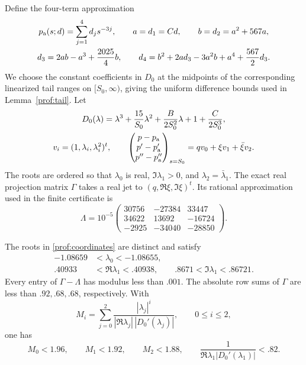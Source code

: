 Define the four-term approximation
\begin{equation}\label{prof:asymptotic-polynomial}
 \begin{gathered}
 p_{\rm a}(s;d)=\sum_{j=1}^4d_js^{-3j},\qquad
 a=d_1=Cd,\qquad b=d_2=a^2+567a,\\
 d_3=2ab-a^3+\frac{2025}{4}b,\qquad
 d_4=b^2+2ad_3-3a^2b+a^4+\frac{567}{2}d_3.
 \end{gathered}
\end{equation}
We choose the constant coefficients in $D_0$ at the midpoints of the
corresponding linearized tail ranges on $[S_0,\infty)$, giving the
uniform difference bounds used in Lemma~\ref{prof:tail}.  Let
\begin{equation}\label{prof:coordinates}
 \begin{gathered}
 D_0(\lambda)=\lambda^3+\frac{15}{S_0}\lambda^2
       +\frac{B}{2S_0^2}\lambda+1+\frac{C}{2S_0^3},\\
 v_i=(1,\lambda_i,\lambda_i^2)^t,\qquad
 \begin{pmatrix}p-p_{\rm a}\\p'-p_{\rm a}'\\p''-p_{\rm a}''\end{pmatrix}_{s=S_0}
       =qv_0+\xi v_1+\bar\xi v_2.
 \end{gathered}
\end{equation}
The roots are ordered so that $\lambda_0$ is real,
$\Im\lambda_1>0$, and $\lambda_2=\bar\lambda_1$.  The exact real
projection matrix $\Gamma$ takes a real jet to $(q,\Re\xi,\Im\xi)^t$.
Its rational approximation used in the finite certificate is
\begin{equation}\label{prof:projection-approximation}
 \Lambda=10^{-5}
 \begin{pmatrix}
 30756&-27384&33447\\
 34622&13692&-16724\\
 -2925&-34040&-28850
 \end{pmatrix}.
\end{equation}

\begin{lemma}\label{prof:root-bounds}
The roots in \eqref{prof:coordinates} are distinct and satisfy
\begin{equation}\label{prof:root-boxes}
 \begin{split}
 -1.08659&<\lambda_0<-1.08655,\\
 .40933&<\Re\lambda_1<.40938,\qquad
 .8671<\Im\lambda_1<.86721.
 \end{split}
\end{equation}
Every entry of $\Gamma-\Lambda$ has modulus less than $.001$.
The absolute row sums of $\Gamma$ are less than $.92,.68,.68$,
respectively.  With
\begin{equation}\label{prof:convolution-constants}
 M_i=\sum_{j=0}^2
 \frac{|\lambda_j|^i}{|\Re\lambda_j|\,|D_0'(\lambda_j)|},\qquad 0\le i\le2,
\end{equation}
one has
\[
 M_0<1.96,\qquad M_1<1.92,\qquad M_2<1.88,
 \qquad \frac1{\Re\lambda_1|D_0'(\lambda_1)|}<.82.
\]
\end{lemma}

